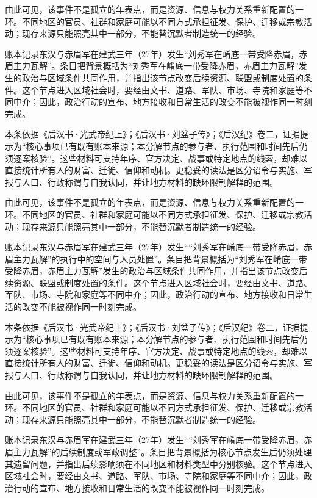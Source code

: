 由此可见，该事件不是孤立的年表点，而是资源、信息与权力关系重新配置的一环。不同地区的官员、社群和家庭可能以不同方式承担征发、保护、迁移或宗教活动；现存来源只能照亮其中一部分，不能替沉默者制造统一的经验。

账本记录东汉与赤眉军在建武三年（27年）发生“刘秀军在崤底一带受降赤眉，赤眉主力瓦解”。条目把背景概括为“刘秀军在崤底一带受降赤眉，赤眉主力瓦解”发生的政治与区域条件共同作用，并指出该节点改变后续资源、联盟或制度处置的条件。这个节点进入区域社会时，要经由文书、道路、军队、市场、寺院和家庭等不同中介；因此，政治行动的宣布、地方接收和日常生活的改变不能被视作同一时刻完成。

本条依据《后汉书·光武帝纪上》；《后汉书·刘盆子传》；《后汉纪》卷二，证据提示为“核心事项已有既有账本来源；本分解节点的参与者、执行范围和时间先后仍须逐案核验”。这些材料可支持年序、官方决定、战事或特定地点的线索，却难以直接统计所有人的财富、迁徙、信仰和动机。更稳妥的读法是区分诏令与实施、军报与人口、行政称谓与自我认同，并让地方材料的缺环限制解释的范围。

由此可见，该事件不是孤立的年表点，而是资源、信息与权力关系重新配置的一环。不同地区的官员、社群和家庭可能以不同方式承担征发、保护、迁移或宗教活动；现存来源只能照亮其中一部分，不能替沉默者制造统一的经验。

账本记录东汉与赤眉军在建武三年（27年）发生““刘秀军在崤底一带受降赤眉，赤眉主力瓦解”的执行中的空间与人员处置”。条目把背景概括为“刘秀军在崤底一带受降赤眉，赤眉主力瓦解”发生的政治与区域条件共同作用，并指出该节点改变后续资源、联盟或制度处置的条件。这个节点进入区域社会时，要经由文书、道路、军队、市场、寺院和家庭等不同中介；因此，政治行动的宣布、地方接收和日常生活的改变不能被视作同一时刻完成。

本条依据《后汉书·光武帝纪上》；《后汉书·刘盆子传》；《后汉纪》卷二，证据提示为“核心事项已有既有账本来源；本分解节点的参与者、执行范围和时间先后仍须逐案核验”。这些材料可支持年序、官方决定、战事或特定地点的线索，却难以直接统计所有人的财富、迁徙、信仰和动机。更稳妥的读法是区分诏令与实施、军报与人口、行政称谓与自我认同，并让地方材料的缺环限制解释的范围。

由此可见，该事件不是孤立的年表点，而是资源、信息与权力关系重新配置的一环。不同地区的官员、社群和家庭可能以不同方式承担征发、保护、迁移或宗教活动；现存来源只能照亮其中一部分，不能替沉默者制造统一的经验。

账本记录东汉与赤眉军在建武三年（27年）发生““刘秀军在崤底一带受降赤眉，赤眉主力瓦解”的后续制度或军政调整”。条目把背景概括为核心节点发生后仍须处理其遗留问题，并指出后续影响须在不同地区和材料类型中分别核验。这个节点进入区域社会时，要经由文书、道路、军队、市场、寺院和家庭等不同中介；因此，政治行动的宣布、地方接收和日常生活的改变不能被视作同一时刻完成。

